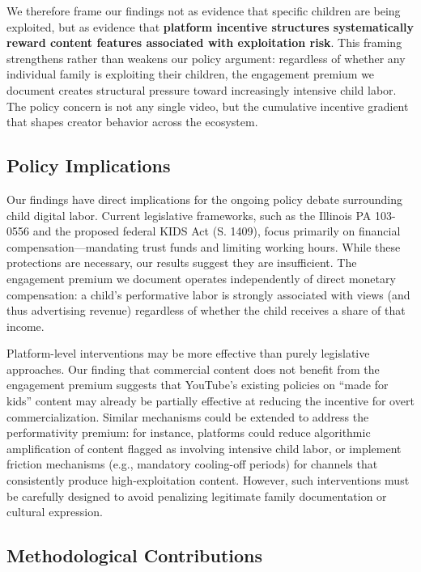 \documentclass[letterpaper]{article} %
\begin{document}
We therefore frame our findings not as evidence that specific children are being exploited, but as evidence that \textbf{platform incentive structures systematically reward content features associated with exploitation risk}. This framing strengthens rather than weakens our policy argument: regardless of whether any individual family is exploiting their children, the engagement premium we document creates structural pressure toward increasingly intensive child labor. The policy concern is not any single video, but the cumulative incentive gradient that shapes creator behavior across the ecosystem.

\subsection{Policy Implications}

Our findings have direct implications for the ongoing policy debate surrounding child digital labor. Current legislative frameworks, such as the Illinois PA 103-0556 and the proposed federal KIDS Act (S. 1409), focus primarily on financial compensation---mandating trust funds and limiting working hours. While these protections are necessary, our results suggest they are insufficient. The engagement premium we document operates independently of direct monetary compensation: a child's performative labor is strongly associated with views (and thus advertising revenue) regardless of whether the child receives a share of that income.

Platform-level interventions may be more effective than purely legislative approaches. Our finding that commercial content does not benefit from the engagement premium suggests that YouTube's existing policies on ``made for kids'' content may already be partially effective at reducing the incentive for overt commercialization. Similar mechanisms could be extended to address the performativity premium: for instance, platforms could reduce algorithmic amplification of content flagged as involving intensive child labor, or implement friction mechanisms (e.g., mandatory cooling-off periods) for channels that consistently produce high-exploitation content. However, such interventions must be carefully designed to avoid penalizing legitimate family documentation or cultural expression.

\subsection{Methodological Contributions}
\end{document}
